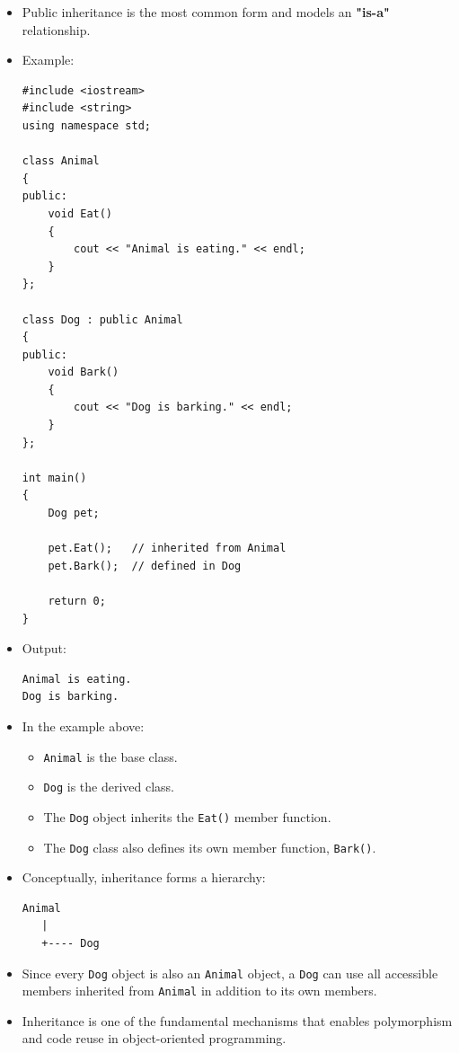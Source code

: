 \documentclass[10pt]{article}
\begin{document}
\begin{itemize}
    \item Public inheritance is the most common form and models an
    \textbf{"is-a"} relationship.

    \item Example:

\begin{verbatim}
#include <iostream>
#include <string>
using namespace std;

class Animal
{
public:
    void Eat()
    {
        cout << "Animal is eating." << endl;
    }
};

class Dog : public Animal
{
public:
    void Bark()
    {
        cout << "Dog is barking." << endl;
    }
};

int main()
{
    Dog pet;

    pet.Eat();   // inherited from Animal
    pet.Bark();  // defined in Dog

    return 0;
}
\end{verbatim}

    \item Output:

\begin{verbatim}
Animal is eating.
Dog is barking.
\end{verbatim}

    \item In the example above:
    \begin{itemize}
        \item \verb|Animal| is the base class.
        \item \verb|Dog| is the derived class.
        \item The \verb|Dog| object inherits the \verb|Eat()| member function.
        \item The \verb|Dog| class also defines its own member function,
        \verb|Bark()|.
    \end{itemize}

    \item Conceptually, inheritance forms a hierarchy:

\begin{verbatim}
Animal
   |
   +---- Dog
\end{verbatim}

    \item Since every \verb|Dog| object is also an \verb|Animal| object,
    a \verb|Dog| can use all accessible members inherited from
    \verb|Animal| in addition to its own members.

    \item Inheritance is one of the fundamental mechanisms that enables
    polymorphism and code reuse in object-oriented programming.
\end{itemize}
\end{document}
